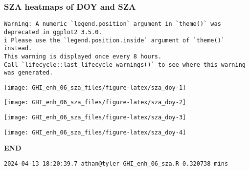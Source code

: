 \documentclass[
  10pt,
  a4paper,oneside]{article}
\begin{document}
\newpage
\FloatBarrier

\hypertarget{sza-heatmaps-of-doy-and-sza}{%
\subsubsection{SZA heatmaps of DOY and SZA}\label{sza-heatmaps-of-doy-and-sza}}

\begin{verbatim}
Warning: A numeric `legend.position` argument in `theme()` was deprecated in ggplot2 3.5.0.
i Please use the `legend.position.inside` argument of `theme()` instead.
This warning is displayed once every 8 hours.
Call `lifecycle::last_lifecycle_warnings()` to see where this warning was generated.
\end{verbatim}

\begin{center}\texttt{[image: GHI\_enh\_06\_sza\_files/figure-latex/sza\_doy-1]} \end{center}

\begin{center}\texttt{[image: GHI\_enh\_06\_sza\_files/figure-latex/sza\_doy-2]} \end{center}

\begin{center}\texttt{[image: GHI\_enh\_06\_sza\_files/figure-latex/sza\_doy-3]} \end{center}

\begin{center}\texttt{[image: GHI\_enh\_06\_sza\_files/figure-latex/sza\_doy-4]} \end{center}

\textbf{END}

\begin{verbatim}
2024-04-13 18:20:39.7 athan@tyler GHI_enh_06_sza.R 0.320738 mins
\end{verbatim}
\end{document}
